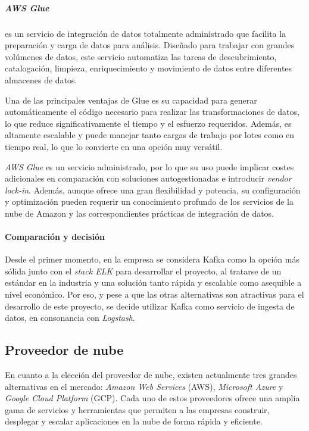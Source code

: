 \subparagraph{AWS Glue} es un servicio de integración de datos totalmente
administrado que facilita la preparación y carga de datos para análisis.
Diseñado para trabajar con grandes volúmenes de datos, este servicio
automatiza las tareas de descubrimiento, catalogación, limpieza, enriquecimiento
y movimiento de datos entre diferentes almacenes de datos.

Una de las principales ventajas de Glue es su capacidad para generar
automáticamente el código necesario para realizar las transformaciones de datos,
lo que reduce significativamente el tiempo y el esfuerzo requeridos. Además, es
altamente escalable y puede manejar tanto cargas de trabajo por lotes como en
tiempo real, lo que lo convierte en una opción muy versátil.

\textit{AWS Glue} es un servicio administrado, por lo que su uso puede implicar
costes adicionales en comparación con soluciones autogestionadas e introducir
\textit{vendor lock-in}. Además, aunque ofrece una gran flexibilidad y potencia,
su configuración y optimización pueden requerir un conocimiento profundo de los
servicios de la nube de Amazon y las correspondientes prácticas de integración
de datos.


\paragraph{Comparación y decisión}
Desde el primer momento, en la empresa se considera Kafka como la opción más
sólida junto con el \textit{stack ELK} para desarrollar el proyecto, al
tratarse de un estándar en la industria y una solución tanto rápida y escalable
como asequible a nivel económico. Por eso, y pese a que las otras alternativas
son atractivas para el desarrollo de este proyecto, se decide utilizar Kafka
como servicio de ingesta de datos, en consonancia con \textit{Logstash}.



\newpage{}
\subsection{Proveedor de nube}\label{subsec:alt_proveedor}
En cuanto a la elección del proveedor de nube, existen actualmente tres
grandes alternativas en el mercado: \textit{Amazon Web Services} (AWS),
\textit{Microsoft Azure} y \textit{Google Cloud Platform} (GCP). Cada uno de
estos proveedores ofrece una amplia gama de servicios y herramientas que
permiten a las empresas construir, desplegar y escalar aplicaciones en la nube
de forma rápida y eficiente.

